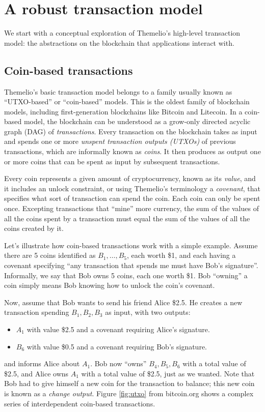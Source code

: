 \documentclass[headinclude,12pt]{scrbook}
\begin{document}
\section{A robust transaction model}

We start with a conceptual exploration of Themelio's high-level transaction model: the abstractions on the blockchain that applications interact with.

\subsection{Coin-based transactions}

Themelio's basic transaction model belongs to a family usually known as ``UTXO-based'' or ``coin-based'' models. This is the oldest family of blockchain models, including first-generation blockchains like Bitcoin and Litecoin. In a coin-based model, the blockchain can be understood as a grow-only directed acyclic graph (DAG) of \emph{transactions}. Every transaction on the blockchain takes as input and spends one or more \emph{unspent transaction outputs (UTXOs)} of previous transactions, which are informally known as \textit{coins}. It then produces as output one or more coins that can be spent as input by subsequent transactions.

Every coin represents a given amount of cryptocurrency, known as its \emph{value}, and it includes an unlock constraint, or using Themelio's terminology a \emph{covenant}, that specifies what sort of transaction can spend the coin. Each coin can only be spent once. Excepting transactions that ``mine'' more currency, the sum of the values of all the coins spent by a transaction must equal the sum of the values of all the coins created by it.

Let's illustrate how coin-based transactions work with a simple example. Assume there are 5 coins identified as $B_1,\dots,B_{5}$, each worth \$1, and each having a covenant specifying ``any transaction that spends me must have Bob's signature''. Informally, we say that Bob owns 5 coins, each one worth \$1. Bob ``owning'' a coin simply means Bob knowing how to unlock the coin's covenant.

Now, assume that Bob wants to send his friend Alice \$2.5. He creates a new transaction spending $B_1,B_2,B_3$ as input, with two outputs:
\begin{itemize}
    \item $A_1$ with value \$2.5 and a covenant requiring Alice's signature.
    \item $B_6$ with value \$0.5 and a covenant requiring Bob's signature.
\end{itemize}
and informs Alice about $A_1$. Bob now ``owns'' $B_4,B_5,B_6$ with a total value of \$2.5, and Alice owns $A_1$ with a total value of \$2.5, just as we wanted. Note that Bob had to give himself a new coin for the transaction to balance; this new coin is known as a \emph{change output}. Figure \ref{fig:utxo} from bitcoin.org shows a complex series of interdependent coin-based transactions.
\end{document}
